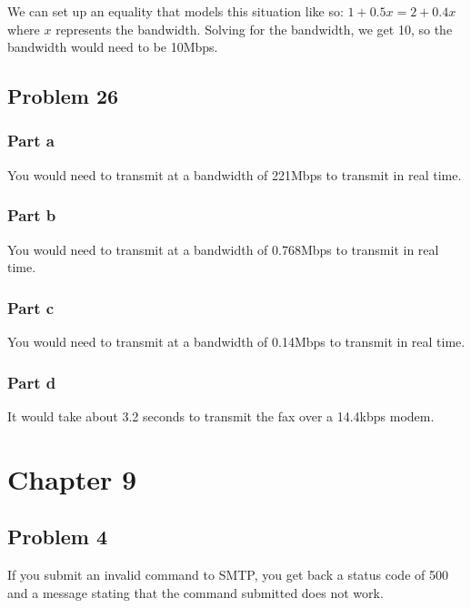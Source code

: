\documentclass{article}%
\begin{document}
We can set up an equality that models this situation like so: $1 + 0.5x = 2 + 0.4x$ where $x$ represents the bandwidth. Solving for the
bandwidth, we get 10, so the bandwidth would need to be 10Mbps.

\subsection*{Problem 26}

\subsubsection*{Part a}
You would need to transmit at a bandwidth of 221Mbps to transmit in real time.

\subsubsection*{Part b}
You would need to transmit at a bandwidth of 0.768Mbps to transmit in real time.

\subsubsection*{Part c}
You would need to transmit at a bandwidth of 0.14Mbps to transmit in real time.

\subsubsection*{Part d}
It would take about 3.2 seconds to transmit the fax over a 14.4kbps modem.

\section*{Chapter 9}
\subsection*{Problem 4}
If you submit an invalid command to SMTP, you get back a status code of 500 and a message
stating that the command submitted does not work.
\end{document}
